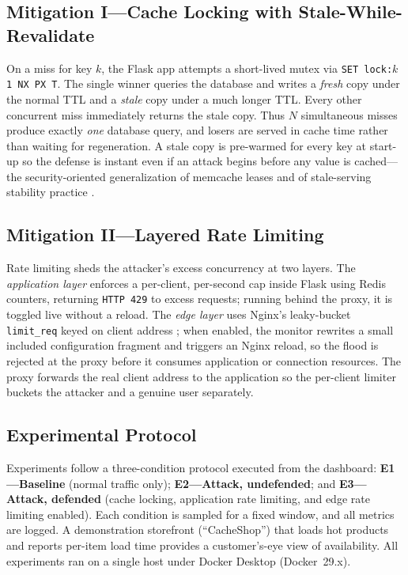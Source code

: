 \documentclass[conference]{IEEEtran}
\begin{document}
\subsection{Mitigation I---Cache Locking with Stale-While-Revalidate}
On a miss for key $k$, the Flask app attempts a short-lived mutex via
\texttt{SET lock:}$k$\texttt{ 1 NX PX T}. The single winner queries the database and
writes a \emph{fresh} copy under the normal TTL and a \emph{stale} copy under a much
longer TTL. Every other concurrent miss immediately returns the stale copy. Thus $N$
simultaneous misses produce exactly \emph{one} database query, and losers are served
in cache time rather than waiting for regeneration. A stale copy is pre-warmed for
every key at start-up so the defense is instant even if an attack begins before any
value is cached---the security-oriented generalization of memcache leases
\cite{nishtala2013} and of stale-serving stability practice \cite{nygard2018}.

\subsection{Mitigation II---Layered Rate Limiting}
Rate limiting sheds the attacker's excess concurrency at two layers. The
\emph{application layer} enforces a per-client, per-second cap inside Flask using
Redis counters, returning \texttt{HTTP 429} to excess requests; running behind the
proxy, it is toggled live without a reload. The \emph{edge layer} uses Nginx's
leaky-bucket \texttt{limit\_req} keyed on client address \cite{nginxlimitreq}; when
enabled, the monitor rewrites a small included configuration fragment and triggers an
Nginx reload, so the flood is rejected at the proxy before it consumes application or
connection resources. The proxy forwards the real client address to the application
so the per-client limiter buckets the attacker and a genuine user separately.

\subsection{Experimental Protocol}
Experiments follow a three-condition protocol executed from the dashboard:
\textbf{E1---Baseline} (normal traffic only); \textbf{E2---Attack, undefended};
and \textbf{E3---Attack, defended} (cache locking, application rate limiting, and edge
rate limiting enabled). Each condition is sampled for a fixed window, and all metrics
are logged. A demonstration storefront (``CacheShop'') that loads hot products and
reports per-item load time provides a customer's-eye view of availability. All
experiments ran on a single host under Docker Desktop (Docker~29.x).
\end{document}
